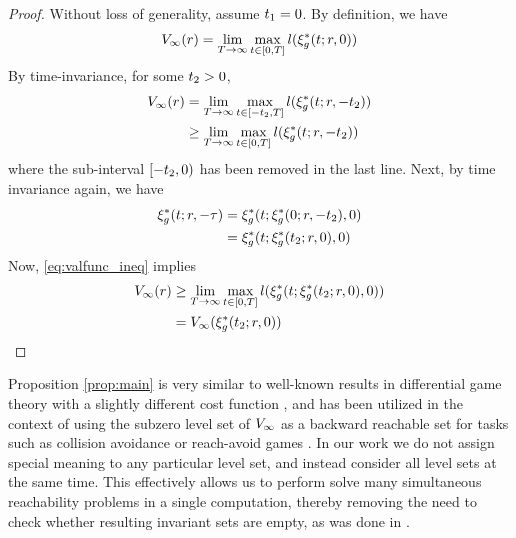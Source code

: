 \begin{proof}
Without loss of generality, assume $t_1=0$. By definition, we have
\begin{equation}
\begin{aligned}
V_\infty(r) & = \lim_{T\rightarrow\infty}\max_{t \in [0, T]} l(\xi_g^*(t; r, 0))\\
\end{aligned}
\end{equation}
By time-invariance, for some $t_2 > 0$,
\begin{equation}
\label{eq:valfunc_ineq}
  \begin{aligned}
V_\infty(r) &= \lim_{T\rightarrow\infty}\max_{t \in [-t_2, T]} l(\xi_g^*(t; r, -t_2)) \\
&\ge \lim_{T\rightarrow\infty}\max_{t \in [0, T]} l(\xi_g^*(t; r, -t_2)) 
  \end{aligned}
\end{equation}  
\noindent where the sub-interval $[-t_2, 0)$ has been removed in the last line. Next, by time invariance again, we  have
\begin{equation}
\begin{aligned}
\xi_g^*(t; r, -\tau) &= \xi_g^*(t; \xi_g^*(0; r, -t_2), 0) \\
&= \xi_g^*(t; \xi_g^*(t_2; r, 0), 0)
\end{aligned}
\end{equation}
Now, \eqref{eq:valfunc_ineq} implies
\begin{equation}
\begin{aligned}
V_\infty(r) &\ge \lim_{T\rightarrow\infty}\max_{t \in [0, T]} l(\xi_g^*(t; \xi_g^*(t_2; r, 0), 0)) \\
&= V_\infty(\xi_g^*(t_2; r, 0))
\end{aligned}
\end{equation} 
\end{proof} 
 \begin{rem} 
   Proposition \ref{prop:main} is very similar to well-known results in differential game theory with a slightly different cost function \cite{Akametalu2014}, and has been utilized in the context of using the subzero level set of $V_\infty$ as a backward reachable set for tasks such as collision avoidance or reach-avoid games \cite{Mitchell05}. In our work we do not assign special meaning to any particular level set, and instead consider all level sets at the same time. This effectively allows us to perform solve many simultaneous reachability problems in a single computation, thereby removing the need to check whether resulting invariant sets are empty, as was done in \cite{Bansal2017}.
 \end{rem}